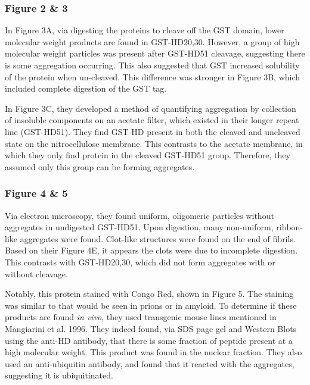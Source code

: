 \subsubsection*{Figure 2 \& 3}

In Figure 3A, via digesting the proteins to cleave off the GST domain, lower molecular weight products are found in GST-HD20,30. However, a group of high molecular weight particles was present after GST-HD51 cleavage, suggesting there is some aggregation occurring. This also suggested that GST increased solubility of the protein when un-cleaved. This difference was stronger in Figure 3B, which included complete digestion of the GST tag.\newline

In Figure 3C, they developed a method of quantifying aggregation by collection of insoluble components on an acetate filter, which existed in their longer repeat line (GST-HD51). They find GST-HD present in both the cleaved and uncleaved state on the nitrocellulose membrane. This contrasts to the acetate membrane, in which they only find protein in the cleaved GST-HD51 group. Therefore, they assumed only this group can be forming aggregates.

\subsubsection*{Figure 4 \& 5}

Via electron microscopy, they found uniform, oligomeric particles without aggregates in undigested GST-HD51. Upon digestion, many non-uniform, ribbon-like aggregates were found. Clot-like structures were found on the end of fibrils. Based on their Figure 4E, it appears the clots were due to incomplete digestion. This contrasts with GST-HD20,30, which did not form aggregates with or without cleavage.\newline

Notably, this protein stained with Congo Red, shown in Figure 5. The staining was similar to that would be seen in prions or in amyloid. To determine if these products are found \textit{in vivo}, they used transgenic mouse lines mentioned in Mangiarini et al. 1996. They indeed found, via SDS page gel and Western Blots using the anti-HD antibody, that there is some fraction of peptide present at a high molecular weight. This product was found in the nuclear fraction. They also used an anti-ubiquitin antibody, and found that it reacted with the aggregates, suggesting it is ubiquitinated.\newline

